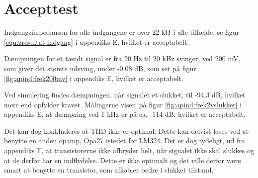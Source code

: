 \section{Accepttest}
Indgangsimpedansen for alle indgangene er over 22 k$\ohm$ i alle tilfælde, se figur \ref{equ:zresultat-indgang} i appendiks E, hvilket er acceptabelt. 

Dæmpningen for et tændt signal er fra 20 Hz til 20 kHz svinger, ved 200 mV, som giver det største udsving, under -0.08 dB, som set på figur \ref{fig:apind:frek200mv} i appendiks E, hvilket er acceptabelt.

Ved simulering findes dæmpningen, når signalet et slukket, til -94,3 dB, hvilket mere end opfylder kravet.
Målingerne viser, på figur \ref{fig:apind:frek2vslukket} i appendiks E, at dæmpning ved 1 kHz er på ca. -114 dB, hvilket er acceptabelt.

Det kan dog konkluderes at THD ikke er optimal. Dette kan delvist løses ved at benytte en anden opamp, Opa27 istedet for LM324. Det er dog tydeligt, ud fra appendiks F, at transistorerne ikke afbryder helt, når signalet ikke skal slukkes og at de derfor har en indflydelse. Dette er ikke optimalt og det ville derfor være smart at benytte en transistor, som afkobler bedre i slukket tilstand.